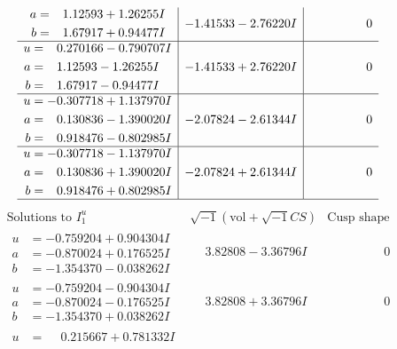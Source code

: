 \documentclass[1p]{elsarticle_modified}
\theoremstyle{definition}
\newcommand{\I}{\sqrt{-1}}
\begin{document}
$$\begin{array}{c|c|c}
\begin{aligned}
a &= \phantom{-}1.12593 + 1.26255 I \\
b &= \phantom{-}1.67917 + 0.94477 I\end{aligned}
 & -1.41533 - 2.76220 I & \phantom{-0.000000 } 0 \\ \hline\begin{aligned}
u &= \phantom{-}0.270166 - 0.790707 I \\
a &= \phantom{-}1.12593 - 1.26255 I \\
b &= \phantom{-}1.67917 - 0.94477 I\end{aligned}
 & -1.41533 + 2.76220 I & \phantom{-0.000000 } 0 \\ \hline\begin{aligned}
u &= -0.307718 + 1.137970 I \\
a &= \phantom{-}0.130836 - 1.390020 I \\
b &= \phantom{-}0.918476 - 0.802985 I\end{aligned}
 & -2.07824 - 2.61344 I & \phantom{-0.000000 } 0 \\ \hline\begin{aligned}
u &= -0.307718 - 1.137970 I \\
a &= \phantom{-}0.130836 + 1.390020 I \\
b &= \phantom{-}0.918476 + 0.802985 I\end{aligned}
 & -2.07824 + 2.61344 I & \phantom{-0.000000 } 0\\
 \hline 
 \end{array}$$\newpage$$\begin{array}{c|c|c}  
\text{Solutions to }I^u_{1}& \I (\text{vol} + \sqrt{-1}CS) & \text{Cusp shape}\\
 \hline 
\begin{aligned}
u &= -0.759204 + 0.904304 I \\
a &= -0.870024 + 0.176525 I \\
b &= -1.354370 - 0.038262 I\end{aligned}
 & \phantom{-}3.82808 - 3.36796 I & \phantom{-0.000000 } 0 \\ \hline\begin{aligned}
u &= -0.759204 - 0.904304 I \\
a &= -0.870024 - 0.176525 I \\
b &= -1.354370 + 0.038262 I\end{aligned}
 & \phantom{-}3.82808 + 3.36796 I & \phantom{-0.000000 } 0 \\ \hline\begin{aligned}
u &= \phantom{-}0.215667 + 0.781332 I \\

\end{aligned}
\end{array}$$
\end{document}
